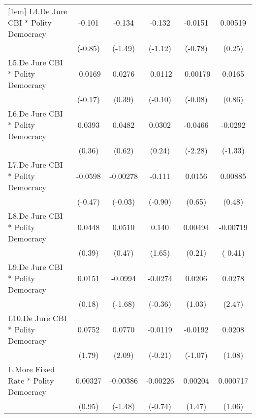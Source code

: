 {\begin{longtable}{l*{5}{c}}
[1em]
L4.De Jure CBI * Polity Democracy&   -0.101         &   -0.134         &   -0.132         &  -0.0151         &  0.00519         \\
                &  (-0.85)         &  (-1.49)         &  (-1.12)         &  (-0.78)         &   (0.25)         \\
[1em]
L5.De Jure CBI * Polity Democracy&  -0.0169         &   0.0276         &  -0.0112         & -0.00179         &   0.0165         \\
                &  (-0.17)         &   (0.39)         &  (-0.10)         &  (-0.08)         &   (0.86)         \\
[1em]
L6.De Jure CBI * Polity Democracy&   0.0393         &   0.0482         &   0.0302         &  -0.0466\sym{*}  &  -0.0292         \\
                &   (0.36)         &   (0.62)         &   (0.24)         &  (-2.28)         &  (-1.33)         \\
[1em]
L7.De Jure CBI * Polity Democracy&  -0.0598         & -0.00278         &   -0.111         &   0.0156         &  0.00885         \\
                &  (-0.47)         &  (-0.03)         &  (-0.90)         &   (0.65)         &   (0.48)         \\
[1em]
L8.De Jure CBI * Polity Democracy&   0.0448         &   0.0510         &    0.140         &  0.00494         & -0.00719         \\
                &   (0.39)         &   (0.47)         &   (1.65)         &   (0.21)         &  (-0.41)         \\
[1em]
L9.De Jure CBI * Polity Democracy&   0.0151         &  -0.0994         &  -0.0274         &   0.0206         &   0.0278\sym{*}  \\
                &   (0.18)         &  (-1.68)         &  (-0.36)         &   (1.03)         &   (2.47)         \\
[1em]
L10.De Jure CBI * Polity Democracy&   0.0752         &   0.0770\sym{*}  &  -0.0119         &  -0.0192         &   0.0208         \\
                &   (1.79)         &   (2.09)         &  (-0.21)         &  (-1.07)         &   (1.08)         \\
[1em]
L.More Fixed Rate * Polity Democracy&  0.00327         & -0.00386         & -0.00226         &  0.00204         & 0.000717         \\
                &   (0.95)         &  (-1.48)         &  (-0.74)         &   (1.47)         &   (1.06)         \\

\end{longtable}}
